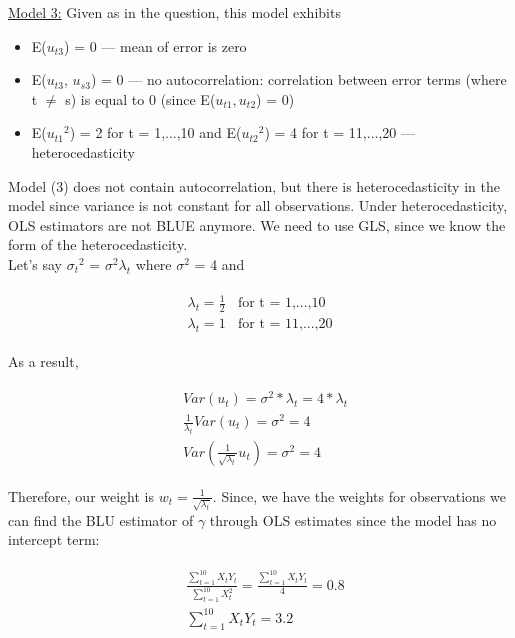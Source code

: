 \documentclass{article}
\begin{document}
\underline{Model 3:} Given as in the question, this model exhibits
\begin{itemize}
    \item E($u_{t3}$) = 0  --- mean of error is zero
    \item E($u_{t3}$, $u_{s3}$) = 0  ---  no autocorrelation: correlation between error terms (where t $\neq$ s) is equal to 0 (since E($u_{t1},u_{t2}$) = 0) 
    \item E(${u_{t1}}^2$) = 2 for t = 1,...,10 and E(${u_{t2}}^2$) = 4 for t = 11,...,20 --- heterocedasticity
\end{itemize}

Model (3) does not contain autocorrelation, but there is heterocedasticity in the model since variance is not constant for all observations. Under heterocedasticity, OLS estimators are not BLUE anymore. We need to use GLS, since we know the form of the heterocedasticity.
\\

Let's say ${\sigma_t}^2$ = ${\sigma}^2 \lambda_t$ where ${\sigma}^2$ = 4 and 

\begin{align}
    \begin{split}
        \lambda_t = \frac{1}{2} \ \ \ \ \text{for t = 1,...,10} \\
        \lambda_t = 1 \ \ \ \ \text{for t = 11,...,20}
    \end{split}
\end{align}

As a result,

\begin{align}
    \begin{split}
        & Var(u_t) = \sigma^2 * \lambda_t = 4 * \lambda_t \\
        & \frac{1}{\lambda_t}Var(u_t) = \sigma^2 = 4 \\
        & Var(\frac{1}{\sqrt{\lambda_t}}u_t) = \sigma^2 = 4
    \end{split}
\end{align}

Therefore, our weight is  $w_t = \frac{1}{\sqrt{\lambda_t}}$. Since, we have the weights for observations we can find the BLU estimator of $\gamma$ through OLS estimates since the model has no intercept term:

\begin{align}
    \begin{split}
        & \frac{\sum_{t=1}^{10} X_t Y_t}{\sum_{t=1}^{10} X_t^2} = \frac{\sum_{t=1}^{10} X_t Y_t}{4} = 0.8 \\ 
        & \sum_{t=1}^{10} X_t Y_t = 3.2 
    \end{split}
\end{align}
\end{document}
